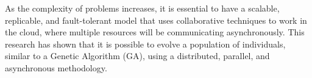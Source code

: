 \documentclass[runningheads]{llncs}
\begin{document}
As the complexity of problems increases, it is essential to have a scalable,
replicable, and fault-tolerant model that uses collaborative techniques to work
in the cloud, where multiple resources will be communicating asynchronously.
This research has shown that it is possible to evolve a population of
individuals, similar to a Genetic Algorithm (GA), using a distributed,
parallel, and asynchronous methodology.


%
%
%



% 



%
%
%


%
\end{document}
